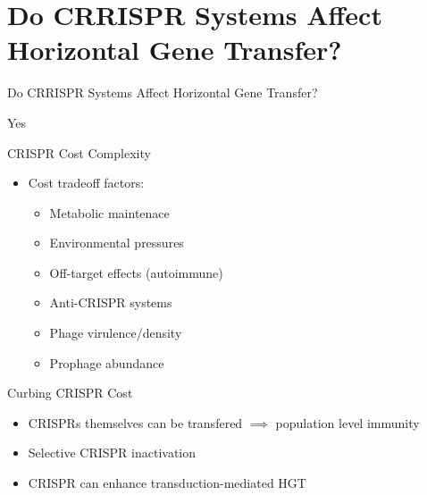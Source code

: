 \documentclass[dvipsnames]{beamer}
\begin{document}
\section{Do CRRISPR Systems Affect Horizontal Gene Transfer?}
\begin{frame}{}
    \begin{center}
        \Huge \textcolor{OliveGreen}{Do CRRISPR Systems Affect Horizontal Gene Transfer?}
    \end{center}
\end{frame}
\begin{frame}{}
    \begin{center}
        \Huge Yes
    \end{center}
\end{frame}
\begin{frame}[fragile]{CRISPR Cost Complexity}
    \begin{itemize}
        \item<2-> Cost tradeoff factors:
        \begin{itemize}
            \item<3-> Metabolic maintenace\autocite{crispgen}
            \item<4-> Environmental pressures\autocite{hospital}
            \item<5-> Off-target effects (autoimmune)\autocite{selfcrisp}
            \item<6-> Anti-CRISPR systems\autocite{acqorres}
            \item<7-> Phage virulence/density\autocite{acqorres}
            \item<8-> Prophage abundance\autocite{transhgt}
        \end{itemize}
    \end{itemize}
\end{frame}
\begin{frame}[fragile]{Curbing CRISPR Cost}
    \begin{itemize}
        \item<2-> CRISPRs themselves can be transfered $\implies$ population level immunity\autocite{crisprlgt}
        \item<3-> Selective CRISPR inactivation\autocite{crispgen}
        \item<4-> CRISPR can enhance transduction-mediated HGT\autocite{transhgt}
    \end{itemize}
\end{frame}
\end{document}
